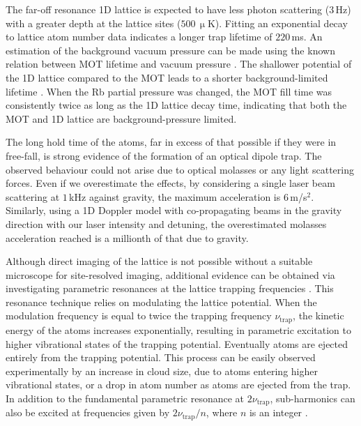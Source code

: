 \documentclass[aps,prl,floatfix,showpacs,twocolumn,amsmath,amssymb,superscriptaddress]{revtex4-2}
\begin{document}
The far-off resonance 1D lattice is expected to have less photon scattering ($3\,$Hz) with a greater depth at the lattice sites ($500\,\upmu$K). Fitting an exponential decay to lattice atom number data indicates a longer trap lifetime of $220\,$ms.
An estimation of the background vacuum pressure can be made using the known relation between MOT lifetime and vacuum pressure
\cite{Arpornthip2012,Moore2015,Burrow2021}. The shallower potential of the 1D lattice compared to the MOT  leads to a shorter background-limited lifetime \cite{GMOT2_McGilligan2017,parametric_oscillation_Wu2006}. When the Rb partial pressure was changed, the MOT fill time was consistently twice as long as the 1D lattice decay time, indicating that both the MOT and 1D lattice are background-pressure limited.

The long hold time of the atoms, far in excess of that possible if they were in free-fall, is strong evidence of the formation of an optical dipole trap. The observed behaviour could not arise due to  optical molasses or any light scattering forces. Even if we overestimate the effects, by considering a single laser beam scattering at $1\,$kHz against gravity, the maximum acceleration is $6\,$m/s$^2$. Similarly, using a 1D Doppler model with co-propagating beams in the gravity direction with our laser intensity and detuning, the overestimated molasses acceleration reached is a millionth of that due to gravity.

Although direct imaging of the lattice is not possible without a suitable microscope for site-resolved imaging,
additional evidence can be obtained via investigating parametric resonances at the lattice trapping frequencies  \cite{CO2_1D_lattice_Friebel1998,parametric_oscillation_Wu2006}. This resonance technique relies on modulating the lattice potential. When the modulation frequency is equal to twice the trapping frequency $\nu_\textrm{trap}$, the kinetic energy of the atoms increases exponentially, resulting in parametric excitation to higher vibrational states of the trapping potential. Eventually atoms are ejected entirely from the trapping potential. This process can be easily observed experimentally by an increase in cloud size, due to atoms entering higher vibrational states, or a drop in atom number as atoms are ejected from the trap. In addition to the fundamental parametric resonance at $2\nu_\textrm{trap}$, sub-harmonics can also be excited at frequencies given by $2\nu_\textrm{trap}/n$, where $n$ is an integer \cite{CO2_1D_lattice_Friebel1998}.
\end{document}
